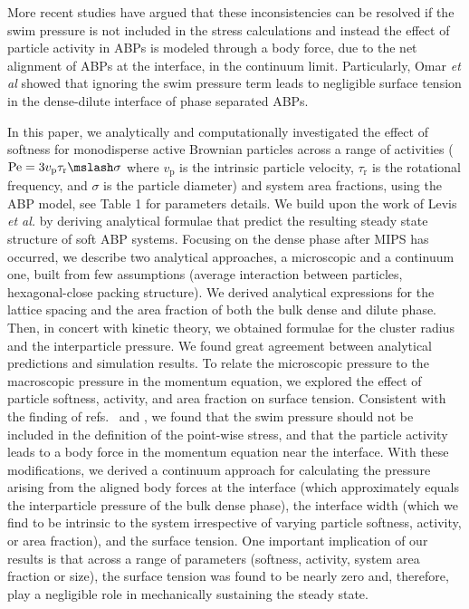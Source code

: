 \documentclass[twoside,twocolumn,9pt]{article}
\begin{document}
More recent studies \cite{Yan2015, Epstein2019, Omar2020MicroscopicMatter} have argued that these inconsistencies can be resolved if the swim pressure is not included in the stress calculations and instead the effect of particle activity in ABPs is modeled through a body force, due to 
the net alignment of ABPs at the interface, in the continuum limit. Particularly, Omar \textit{et al} showed that ignoring the swim pressure term 
leads to negligible surface tension in the dense-dilute interface of phase separated ABPs. 

In this paper, we analytically and computationally investigated the effect of softness for monodisperse active Brownian particles across a range of activities ($\mathrm{Pe}=3v_\text{p}\tau_\text{r}\mslash \sigma$ where $v_\text{p}$ is the intrinsic particle velocity, $\tau_\text{r}$ is the rotational frequency, and $\sigma$ is the particle diameter) and system area fractions, using the ABP model, see Table 1 for parameters details. We build upon the work of Levis \textit{et al.} \cite{Levis2017} by deriving analytical formulae that predict the resulting steady state structure of soft ABP systems. Focusing on the dense phase after MIPS has occurred, we describe two analytical approaches, a microscopic and a continuum one, built from few assumptions (average interaction between particles, hexagonal-close packing structure). We derived analytical expressions for the lattice spacing and the area fraction of both the bulk dense and dilute phase.  Then, in concert with kinetic theory, we obtained formulae for the cluster radius and the interparticle pressure. We found great agreement between analytical predictions and simulation results. To relate the microscopic pressure to the macroscopic pressure in the momentum equation, we explored the effect of particle softness, activity, and area fraction on surface tension. Consistent with the finding of refs.~ and , we found that the swim pressure should not be included in the definition of the point-wise stress, and that the particle activity leads to a body force in the momentum equation near the interface. With these modifications, we derived a continuum approach for calculating the pressure arising from the aligned body forces at the interface (which approximately equals the interparticle pressure of the bulk dense phase), the interface width (which we find to be intrinsic to the system irrespective of varying particle softness, activity, or area fraction), and the surface tension. One important implication of our results is that across a range of parameters (softness, activity, system area fraction or size), the surface tension was found to be nearly zero and, therefore, play a negligible role in mechanically sustaining the steady state. 
\end{document}
